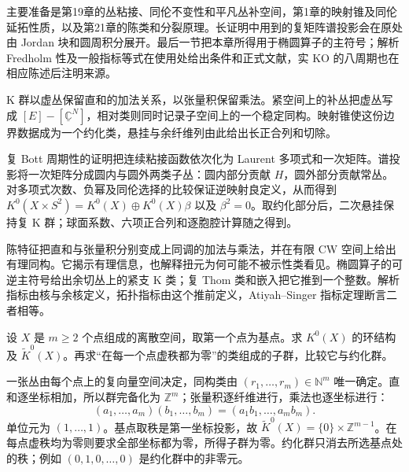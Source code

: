 \ProseParagraphBreak

主要准备是第19章的丛粘接、同伦不变性和平凡丛补空间，第1章的映射锥及同伦延拓性质，以及第21章的陈类和分裂原理。长证明中用到的复矩阵谱投影会在原处由 Jordan 块和圆周积分展开。最后一节把本章所得用于椭圆算子的主符号；解析 Fredholm 性及一般指标等式在使用处给出条件和正式文献，实 KO 的八周期也在相应陈述后注明来源。






\begin{chaptersummary}
	K 群以虚丛保留直和的加法关系，以张量积保留乘法。紧空间上的补丛把虚丛写成 \([E]-[\underline{\mathbb C}^N]\)，相对类则同时记录子空间上的一个稳定同构。映射锥使这份边界数据成为一个约化类，悬挂与余纤维列由此给出长正合列和切除。

	\ProseParagraphBreak

	复 Bott 周期性的证明把连续粘接函数依次化为 Laurent 多项式和一次矩阵。谱投影将一次矩阵分成圆内与圆外两类子丛：圆内部分贡献 \(H\)，圆外部分贡献常丛。对多项式次数、负幂及同伦选择的比较保证逆映射良定义，从而得到 \(K^0(X\times S^2)=K^0(X)\oplus K^0(X)\beta\) 以及 \(\beta^2=0\)。取约化部分后，二次悬挂保持复 K 群；球面系数、六项正合列和逐胞腔计算随之得到。

	\ProseParagraphBreak

	陈特征把直和与张量积分别变成上同调的加法与乘法，并在有限 CW 空间上给出有理同构。它揭示有理信息，也解释扭元为何可能不被示性类看见。椭圆算子的可逆主符号给出余切丛上的紧支 K 类；复 Thom 类和嵌入把它推到一个整数。解析指标由核与余核定义，拓扑指标由这个推前定义，Atiyah--Singer 指标定理断言二者相等。
\end{chaptersummary}

\BookExercises

\begin{exercise}\label{g2:ex:k-disconnected-reduction}
	设 \(X\) 是 \(m\ge2\) 个点组成的离散空间，取第一个点为基点。求 \(K^0(X)\) 的环结构及 \(\widetilde K^0(X)\)。再求“在每一个点虚秩都为零”的类组成的子群，比较它与约化群。
\end{exercise}
\begin{solution}
	一张丛由每个点上的复向量空间决定，同构类由 \((r_1,\ldots,r_m)\in\mathbb N^m\) 唯一确定。直和逐坐标相加，所以群完备化为 \(\mathbb Z^m\)；张量积逐纤维进行，乘法也逐坐标进行：
	\[
		(a_1,\ldots,a_m)(b_1,\ldots,b_m)=(a_1b_1,\ldots,a_mb_m).
	\]
	单位元为 \((1,\ldots,1)\)。基点取秩是第一坐标投影，故 \(\widetilde K^0(X)=\{0\}\times\mathbb Z^{m-1}\)。在每点虚秩均为零则要求全部坐标都为零，所得子群为零。约化群只消去所选基点处的秩；例如 \((0,1,0,\ldots,0)\) 是约化群中的非零元。
\end{solution}

